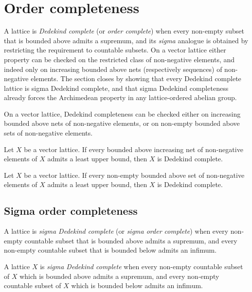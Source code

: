 \section{Order completeness}

A lattice is \emph{Dedekind complete} (or \emph{order complete}) when
every non-empty subset that is bounded above admits a supremum, and its
\emph{sigma} analogue is obtained by restricting the requirement to
countable subsets. On a vector lattice either property can be checked
on the restricted class of non-negative elements, and indeed only on
increasing bounded above nets (respectively sequences) of non-negative
elements. The section closes by showing that every Dedekind complete
lattice is sigma Dedekind complete, and that sigma Dedekind
completeness already forces the Archimedean property in any
lattice-ordered abelian group.

On a vector lattice, Dedekind completeness can be checked either on
increasing bounded above nets of non-negative elements, or on
non-empty bounded above sets of non-negative elements.

\begin{theorem}
\label{thm:conditionallyCompleteLatticeOfPosNet}
\leanok
{}
Let $X$ be a vector lattice. If every bounded above increasing net of
non-negative elements of $X$ admits a least upper bound, then $X$ is
Dedekind complete.
\end{theorem}

\begin{theorem}
\label{thm:conditionallyCompleteLatticeOfPosSet}
\leanok
{}
Let $X$ be a vector lattice. If every non-empty bounded above set of
non-negative elements of $X$ admits a least upper bound, then $X$ is
Dedekind complete.
\end{theorem}

\subsection{Sigma order completeness}

A lattice is \emph{sigma Dedekind complete} (or \emph{sigma order
complete}) when every non-empty countable subset that is bounded above
admits a supremum, and every non-empty countable subset that is
bounded below admits an infimum.

\begin{definition}
\label{def:sigmaConditionallyCompleteLattice}
\leanok
A lattice $X$ is \emph{sigma Dedekind complete} when every non-empty
countable subset of $X$ which is bounded above admits a supremum, and
every non-empty countable subset of $X$ which is bounded below admits
an infimum.
\end{definition}

